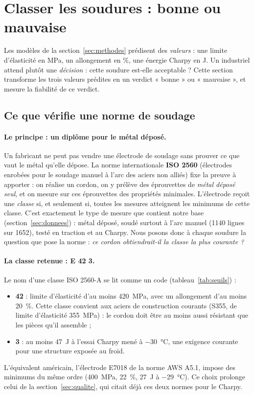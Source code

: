 \section{Classer les soudures : bonne ou mauvaise}\label{sec:classification}

Les modèles de la section~\ref{sec:methodes} prédisent des \emph{valeurs} : une limite
d'élasticité en \si{\mega\pascal}, un allongement en \%, une énergie Charpy en
\si{\joule}. Un industriel attend plutôt une \emph{décision} : cette soudure est-elle
acceptable ? Cette section transforme les trois valeurs prédites en un verdict
« bonne » ou « mauvaise », et mesure la fiabilité de ce verdict.

\subsection{Ce que vérifie une norme de soudage}\label{sec:norme}

\paragraph{Le principe : un diplôme pour le métal déposé.} Un fabricant ne peut pas
vendre une électrode de soudage sans prouver ce que vaut le métal qu'elle dépose. La
norme internationale \textbf{ISO 2560} (électrodes enrobées pour le soudage manuel à
l'arc des aciers non alliés) fixe la preuve à apporter : on réalise un cordon, on y
prélève des éprouvettes de \emph{métal déposé seul}, et on mesure sur ces éprouvettes
des propriétés minimales. L'électrode reçoit une \emph{classe} si, et seulement si,
toutes les mesures atteignent les minimums de cette classe. C'est exactement le type
de mesure que contient notre base (section~\ref{sec:donnees}) : métal déposé, soudé
surtout à l'arc manuel (1140 lignes sur 1652), testé en traction et au Charpy. Nous
posons donc à chaque soudure la question que pose la norme : \emph{ce cordon
obtiendrait-il la classe la plus courante ?}

\paragraph{La classe retenue : E 42 3.} Le nom d'une classe ISO 2560-A se lit comme un
code (tableau~\ref{tab:seuils}) :
\begin{itemize}
  \item \textbf{42} : limite d'élasticité d'au moins \SI{420}{\mega\pascal}, avec un
    allongement d'au moins \SI{20}{\percent}. Cette classe convient aux aciers de
    construction courants (S355, de limite d'élasticité \SI{355}{\mega\pascal}) : le
    cordon doit être au moins aussi résistant que les pièces qu'il assemble ;
  \item \textbf{3} : au moins \SI{47}{\joule} à l'essai Charpy mené à
    \SI{-30}{\celsius}, une exigence courante pour une structure exposée au froid.
\end{itemize}
L'équivalent américain, l'électrode E7018 de la norme AWS A5.1, impose des minimums du
même ordre (\SI{400}{\mega\pascal}, \SI{22}{\percent}, \SI{27}{\joule} à
\SI{-29}{\celsius}). Ce choix prolonge celui de la section~\ref{sec:qualite}, qui
citait déjà ces deux normes pour le Charpy.

